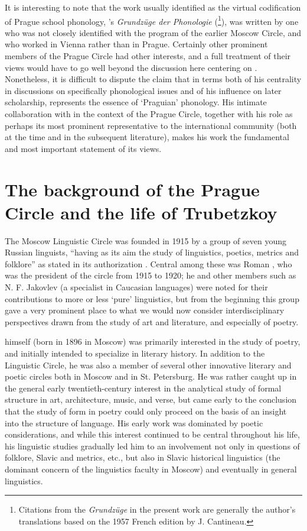 It is interesting to note that the work usually identified as the
virtual codification of Prague school phonology, {\Trubetzkoy}'s
\textsl{Grundzüge der Phonologie}
(\citealt{trubetzkoy39:grundzuge}\footnote{Citations from the
  \textsl{Grundzüge} in the present work are generally the author's
  translations based on the 1957 {French} edition by J. Cantineau.}), was
written by one who was not closely identified with the program of the
earlier Moscow Circle, and who worked in Vienna rather than in
Prague. Certainly other prominent members of the Prague Circle had
other interests, and a full treatment of their views would have to go
well beyond the discussion here centering on {\Trubetzkoy}. Nonetheless,
it is difficult to dispute the claim that in terms both of his
centrality in discussions on specifically phonological issues and of
his influence on later scholarship, {\Trubetzkoy} represents the essence
of `Praguian' phonology. His intimate collaboration with {\Jakobson} in
the context of the Prague Circle, together with his role as perhaps
its most prominent representative to the international community (both
at the time and in the subsequent literature), makes his work the
fundamental and most important statement of its views.

\section{The background of the Prague Circle and the life of Trubetzkoy}
\label{sec:backgr-prag-circle}

The Moscow Linguistic Circle was founded in 1915 by a group of seven
young {Russian} linguists, ``having as its aim the study of linguistics,
poetics, metrics and folklore'' as stated in its authorization
\citep[530]{jakobson65:terms}. Central among these was Roman
{\Jakobson}, who was the president of the circle from 1915 to 1920; he
and other members such as N. F. Jakovlev (a specialist in Caucasian
languages) were noted for their contributions to more or less `pure'
linguistics, but from the beginning this group gave a very prominent
place to what we would now consider interdisciplinary perspectives
drawn from the study of art and literature, and especially of poetry.

{\Jakobson} himself (born in 1896 in Moscow) was primarily interested in
the study of poetry, and initially intended to specialize in literary
history. In addition to the Linguistic Circle, he was also a member of
several other innovative literary and poetic circles both in Moscow
and in St. Petersburg. He was rather caught up in the general early
twentieth-century interest in the analytical study of formal structure
in art, architecture, music, and verse, but came early to the
conclusion that the study of form in poetry could only proceed on the
basis of an insight into the structure of language. His early work was
dominated by poetic considerations, and while this interest continued
to be central throughout his life, his linguistic studies gradually
led him to an involvement not only in questions of folklore, Slavic
and  metrics, etc., but also in Slavic historical
linguistics (the dominant concern of the linguistics faculty in
Moscow) and eventually in general linguistics.

